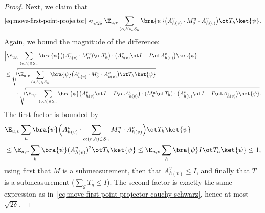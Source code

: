 \begin{proof}
  Next, we claim that
  \begin{equation}\label{eq:move-second-point-projector}
    \eqref{eq:move-first-point-projector}
    \approx_{\sqrt{2\delta}}
    \E_{u,v} \sum_{(o, h) \in S_{u}} \bra{\psi} \bigl(A^{v}_{h(v)} \cdot M^{u}_o \cdot A^{v}_{h(v)}\bigr) \ot T_h  \ket{\psi}.
  \end{equation}
  Again, we bound the magnitude of the difference:
  \begin{align}\label{eq:move-second-point-projector-cauchy-schwarz}
    &\Big|\E_{u,v} \sum_{(o, h) \in S_{u}} \bra{\psi} \bigl((A^{v}_{h(v)} \cdot M^{u}_o) \ot T_h\bigr) \cdot \bigl(A^{v}_{h(v)} \ot I - I \ot A^{v}_{h(v)}\bigr)  \ket{\psi}\Big| \notag\\
    &\leq \sqrt{\E_{u,v} \sum_{(o, h) \in S_{u}} \bra{\psi} \bigl(A^{v}_{h(v)} \cdot M^{u}_o \cdot A^{v}_{h(v)}\bigr) \ot T_h  \ket{\psi}} \\
    &\qquad\cdot \sqrt{\E_{u,v} \sum_{(o, h) \in S_{u}} \bra{\psi} \bigl(A^{v}_{h(v)} \ot I - I \ot A^{v}_{h(v)}\bigr) \cdot (M^{u}_o \ot T_h) \cdot \bigl(A^{v}_{h(v)} \ot I - I \ot A^{v}_{h(v)}\bigr) \ket{\psi}}. \notag
  \end{align}
  The first factor is bounded by
  \begin{align*}
    &\E_{u,v} \sum_h \bra{\psi}
      \Bigl(A^v_{h(v)} \cdot \sum_{o:(o,h)\in S_u} M^u_o \cdot A^v_{h(v)}\Bigr)
      \ot T_h \ket{\psi} \\
    &\le \E_{u,v} \sum_h \bra{\psi} (A^v_{h(v)})^2 \ot T_h \ket{\psi}
      \le \E_{u,v} \sum_h \bra{\psi} I \ot T_h \ket{\psi}
      \le 1,
  \end{align*}
  using first that $M$ is a submeasurement, then that $A^v_{h(v)} \le I$, and
  finally that $T$ is a submeasurement ($\sum_g T_g \le I$). The second factor is
  exactly the same expression
  as in~\eqref{eq:move-first-point-projector-cauchy-schwarz}, hence at most
  $\sqrt{2\delta}$.


\end{proof}
